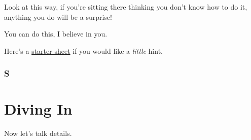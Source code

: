 \documentclass[]{book}
\begin{document}
Look at this way, if you're sitting there thinking you don't know how to
do it, anything you do will be a surprise!

You can do this, I believe in you.

Here's a \href{worksheets/scratch_surprise.pdf}{starter sheet} if you
would like a \emph{little} hint.

\hypertarget{s}{%
\subsection{S}\label{s}}

\hypertarget{diving-in}{%
\chapter{Diving In}\label{diving-in}}

Now let's talk details.


\end{document}
